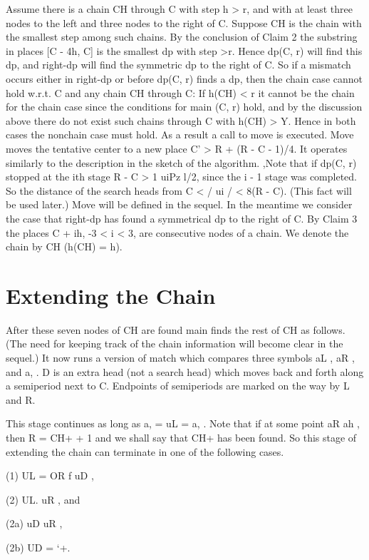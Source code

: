\documentclass[11pt,a4paper]{report}
\begin{document}
Assume there is a chain CH through C with step h > r, and with at least three nodes
to the left and three nodes to the right of C. Suppose CH is the chain with the smallest
step among such chains. By the conclusion of Claim 2 the substring in places [C - 4h, C]
is the smallest dp with step >r. Hence dp(C, r) will find this dp, and right-dp will find
the symmetric dp to the right of C. So if a mismatch occurs either in right-dp or before
dp(C, r) finds a dp, then the chain case cannot hold w.r.t. C and any chain CH through
C: If h(CH) < r it cannot be the chain for the chain case since the conditions for main
(C, r) hold, and by the discussion above there do not exist such chains through C with
h(CH) > Y. Hence in both cases the nonchain case must hold. As a result a call to move
is executed. Move moves the tentative center to a new place C’ > R + (R - C - 1)/4.
It operates similarly to the description in the sketch of the algorithm. ,Note that if dp(C, r)
stopped at the ith stage R - C > 1 uiPz l/2, since the i - 1 stage was completed. So the
distance of the search heads from C < / ui / < 8(R - C). (This fact will be used later.)
Move will be defined in the sequel. In the meantime we consider the case that right-dp
has found a symmetrical dp to the right of C. By Claim 3 the places C + ih, -3 < i < 3,
are consecutive nodes of a chain. We denote the chain by CH (h(CH) = h). 




\chapter{Extending the Chain}


After these seven nodes of CH are found main finds the rest of CH as follows. (The
need for keeping track of the chain information will become clear in the sequel.) It now
runs a version of match which compares three symbols aL , aR , and a, . D is an extra
head (not a search head) which moves back and forth along a semiperiod next to C.
Endpoints of semiperiods are marked on the way by L and R.

This stage continues as long as a, = uL = a, . Note that if at some point aR ah ,
then R = CH+ + 1 and we shall say that CH+ has been found. So this stage of extending
the chain can terminate in one of the following cases.

(1) UL = OR f uD ,

(2) UL. uR , and
\begin{myindentpar}{3cm}
(2a) uD  uR ,

(2b) UD = ‘+.
\end{myindentpar}
\end{document}
